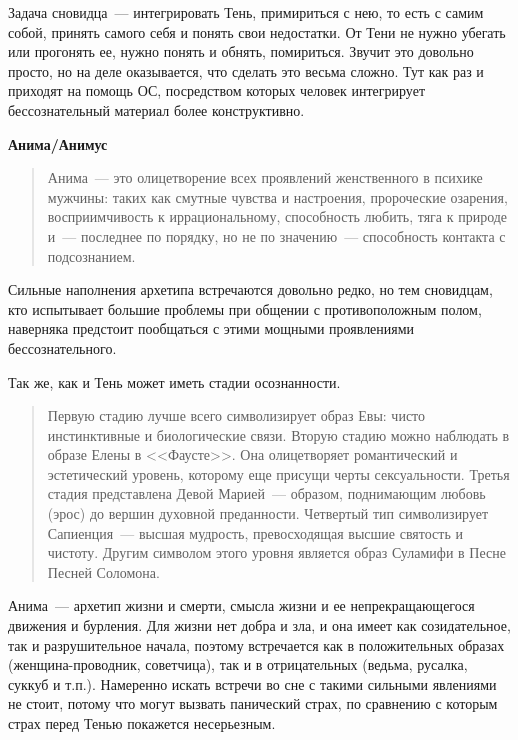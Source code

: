 \documentclass[a4paper,14pt,oneside]{memoir}
\begin{document}
Задача сновидца~--- интегрировать Тень, примириться с нею, то есть с самим собой, принять самого себя и понять свои недостатки. От Тени не нужно убегать или прогонять ее, нужно понять и обнять, помириться. Звучит это довольно просто, но на деле оказывается, что сделать это весьма сложно. Тут как раз и приходят на помощь ОС, посредством которых человек интегрирует бессознательный материал более конструктивно.

\begin{center}
\bfseries{Анима/Анимус}
\end{center} 


\begin{quotation}
Анима~--- это олицетворение всех проявлений женственного в психике мужчины: таких как смутные чувства и настроения, пророческие озарения, восприимчивость к иррациональному, способность любить, тяга к природе и~--- последнее по порядку, но не по значению~--- способность контакта с подсознанием. 
\end{quotation}

Сильные наполнения архетипа встречаются довольно редко, но тем сновидцам, кто испытывает большие проблемы при общении с противоположным полом, наверняка предстоит пообщаться с этими мощными проявлениями бессознательного.

Так же, как и Тень может иметь стадии осознанности.

\begin{quotation}
Первую стадию лучше всего символизирует образ Евы: чисто инстинктивные и биологические связи. Вторую стадию можно наблюдать в образе Елены в <<Фаусте>>. Она олицетворяет романтический и эстетический уровень, которому еще присущи черты сексуальности. Третья стадия представлена Девой Марией~--- образом, поднимающим любовь (эрос) до вершин духовной преданности. Четвертый тип символизирует Сапиенция~--- высшая мудрость, превосходящая высшие святость и чистоту. Другим символом этого уровня является образ Суламифи в Песне Песней Соломона. 
\end{quotation}

Анима~--- архетип жизни и смерти, смысла жизни и ее непрекращающегося движения и бурления. Для жизни нет добра и зла, и она имеет как созидательное, так и разрушительное начала, поэтому встречается как в положительных образах (женщина-проводник, советчица), так и в отрицательных (ведьма, русалка, суккуб и т.п.). Намеренно искать встречи во сне с такими сильными явлениями не стоит, потому что могут вызвать панический страх, по сравнению с которым страх перед Тенью покажется несерьезным.
\end{document}
